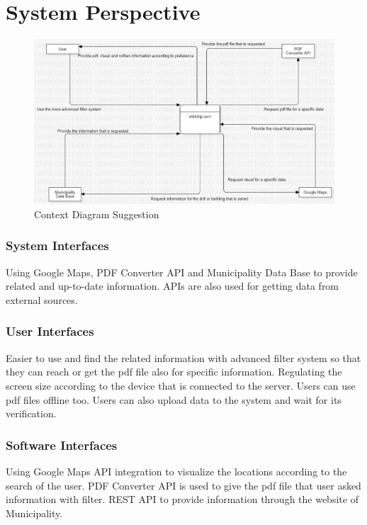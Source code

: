 \documentclass[12pt]{report}
\begin{document}
\section{System Perspective}
\begin{figure}[H]
    \includegraphics[scale=0.5]{context2}
    \centering
    \caption{Context Diagram Suggestion}
\end{figure}

\subsubsection{System Interfaces}
Using Google Maps, PDF Converter API and Municipality Data Base to provide related and up-to-date information. APIs are also used for getting data from external sources.

\subsubsection{User Interfaces}
Easier to use and find the related information with advanced filter system so that they can reach or get the pdf file also for specific information. Regulating the screen size according to the device that is connected to the server. Users can use pdf files offline too. Users can also upload data to the system and wait for its verification.

\subsubsection{Software Interfaces}
Using Google Maps API integration to visualize the locations according to the search of the user. PDF Converter API is used to give the pdf file that user asked information with filter. REST API to provide information through the website of Municipality.
\end{document}
